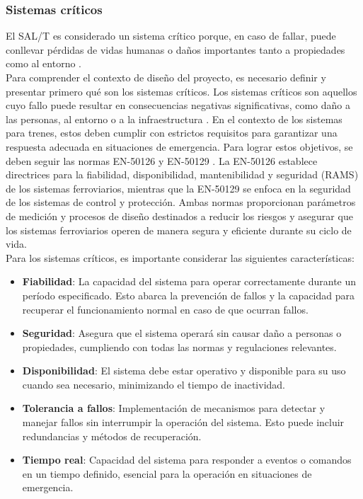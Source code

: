 

\subsubsection{Sistemas críticos}


El SAL/T es considerado un sistema crítico porque, en caso de fallar, puede conllevar pérdidas de vidas humanas o daños importantes tanto a propiedades como al entorno \cite{norma_61508}. \\

Para comprender el contexto de diseño del proyecto, es necesario definir y presentar primero qué son los sistemas críticos. Los sistemas críticos son aquellos cuyo fallo puede resultar en consecuencias negativas significativas, como daño a las personas, al entorno o a la infraestructura \cite{norma_61508}. En el contexto de los sistemas para trenes, estos deben cumplir con estrictos requisitos para garantizar una respuesta adecuada en situaciones de emergencia. Para lograr estos objetivos, se deben seguir las normas EN-50126 y EN-50129 \cite{norma_50129}. La EN-50126 establece directrices para la fiabilidad, disponibilidad, mantenibilidad y seguridad (RAMS) de los sistemas ferroviarios, mientras que la EN-50129 se enfoca en la seguridad de los sistemas de control y protección. Ambas normas proporcionan parámetros de medición y procesos de diseño destinados a reducir los riesgos y asegurar que los sistemas ferroviarios operen de manera segura y eficiente durante su ciclo de vida.\\


Para los sistemas críticos, es importante considerar las siguientes características: 
\begin{itemize}
    \item \textbf{Fiabilidad}: La capacidad del sistema para operar correctamente durante un período especificado. Esto abarca la prevención de fallos y la capacidad para recuperar el funcionamiento normal en caso de que ocurran fallos. 
    \item \textbf{Seguridad}: Asegura que el sistema operará sin causar daño a personas o propiedades, cumpliendo con todas las normas y regulaciones relevantes.
    \item \textbf{Disponibilidad}: El sistema debe estar operativo y disponible para su uso cuando sea necesario, minimizando el tiempo de inactividad.
    \item \textbf{Tolerancia a fallos}: Implementación de mecanismos para detectar y manejar fallos sin interrumpir la operación del sistema. Esto puede incluir redundancias y métodos de recuperación.
    \item \textbf{Tiempo real}: Capacidad del sistema para responder a eventos o comandos en un tiempo definido, esencial para la operación en situaciones de emergencia.
\end{itemize}

